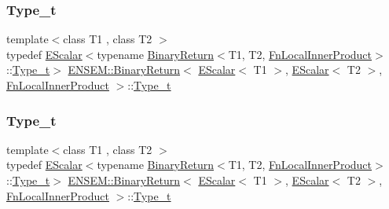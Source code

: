 \subsubsection{\texorpdfstring{Type\_t}{Type\_t}\hspace{0.1cm}{\footnotesize\ttfamily [2/3]}}
{\footnotesize\ttfamily template$<$class T1 , class T2 $>$ \\
typedef \mbox{\hyperlink{classENSEM_1_1EScalar}{E\+Scalar}}$<$typename \mbox{\hyperlink{structENSEM_1_1BinaryReturn}{Binary\+Return}}$<$T1, T2, \mbox{\hyperlink{structENSEM_1_1FnLocalInnerProduct}{Fn\+Local\+Inner\+Product}}$>$\+::\mbox{\hyperlink{structENSEM_1_1BinaryReturn_3_01EScalar_3_01T1_01_4_00_01EScalar_3_01T2_01_4_00_01FnLocalInnerProduct_01_4_a81f5a6b43c1af40c9ed19f84d9b1770f}{Type\+\_\+t}}$>$ \mbox{\hyperlink{structENSEM_1_1BinaryReturn}{E\+N\+S\+E\+M\+::\+Binary\+Return}}$<$ \mbox{\hyperlink{classENSEM_1_1EScalar}{E\+Scalar}}$<$ T1 $>$, \mbox{\hyperlink{classENSEM_1_1EScalar}{E\+Scalar}}$<$ T2 $>$, \mbox{\hyperlink{structENSEM_1_1FnLocalInnerProduct}{Fn\+Local\+Inner\+Product}} $>$\+::\mbox{\hyperlink{structENSEM_1_1BinaryReturn_3_01EScalar_3_01T1_01_4_00_01EScalar_3_01T2_01_4_00_01FnLocalInnerProduct_01_4_a81f5a6b43c1af40c9ed19f84d9b1770f}{Type\+\_\+t}}}

\mbox{\label{structENSEM_1_1BinaryReturn_3_01EScalar_3_01T1_01_4_00_01EScalar_3_01T2_01_4_00_01FnLocalInnerProduct_01_4_a81f5a6b43c1af40c9ed19f84d9b1770f}} 
\subsubsection{\texorpdfstring{Type\_t}{Type\_t}\hspace{0.1cm}{\footnotesize\ttfamily [3/3]}}
{\footnotesize\ttfamily template$<$class T1 , class T2 $>$ \\
typedef \mbox{\hyperlink{classENSEM_1_1EScalar}{E\+Scalar}}$<$typename \mbox{\hyperlink{structENSEM_1_1BinaryReturn}{Binary\+Return}}$<$T1, T2, \mbox{\hyperlink{structENSEM_1_1FnLocalInnerProduct}{Fn\+Local\+Inner\+Product}}$>$\+::\mbox{\hyperlink{structENSEM_1_1BinaryReturn_3_01EScalar_3_01T1_01_4_00_01EScalar_3_01T2_01_4_00_01FnLocalInnerProduct_01_4_a81f5a6b43c1af40c9ed19f84d9b1770f}{Type\+\_\+t}}$>$ \mbox{\hyperlink{structENSEM_1_1BinaryReturn}{E\+N\+S\+E\+M\+::\+Binary\+Return}}$<$ \mbox{\hyperlink{classENSEM_1_1EScalar}{E\+Scalar}}$<$ T1 $>$, \mbox{\hyperlink{classENSEM_1_1EScalar}{E\+Scalar}}$<$ T2 $>$, \mbox{\hyperlink{structENSEM_1_1FnLocalInnerProduct}{Fn\+Local\+Inner\+Product}} $>$\+::\mbox{\hyperlink{structENSEM_1_1BinaryReturn_3_01EScalar_3_01T1_01_4_00_01EScalar_3_01T2_01_4_00_01FnLocalInnerProduct_01_4_a81f5a6b43c1af40c9ed19f84d9b1770f}{Type\+\_\+t}}}



